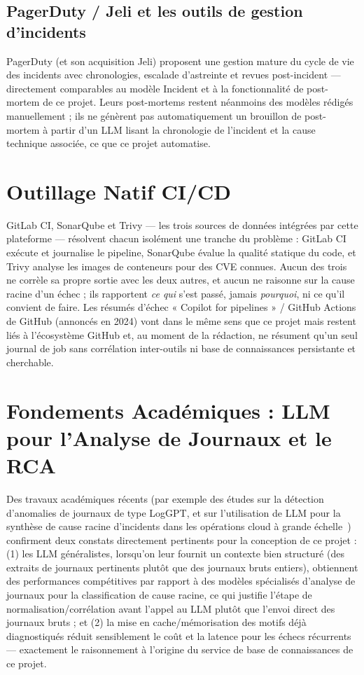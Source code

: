 \documentclass[12pt,a4paper,oneside]{report}
\begin{document}
\subsection{PagerDuty / Jeli et les outils de gestion d'incidents}
PagerDuty (et son acquisition Jeli) proposent une gestion mature du cycle de vie des incidents avec chronologies, escalade d'astreinte et revues post-incident --- directement comparables au modèle Incident et à la fonctionnalité de post-mortem de ce projet. Leurs post-mortems restent néanmoins des modèles rédigés manuellement ; ils ne génèrent pas automatiquement un brouillon de post-mortem à partir d'un LLM lisant la chronologie de l'incident et la cause technique associée, ce que ce projet automatise.

\section{Outillage Natif CI/CD}
GitLab CI, SonarQube et Trivy --- les trois sources de données intégrées par cette plateforme --- résolvent chacun isolément une tranche du problème : GitLab CI exécute et journalise le pipeline, SonarQube évalue la qualité statique du code, et Trivy analyse les images de conteneurs pour des CVE connues. Aucun des trois ne corrèle sa propre sortie avec les deux autres, et aucun ne raisonne sur la cause racine d'un échec ; ils rapportent \emph{ce qui} s'est passé, jamais \emph{pourquoi}, ni ce qu'il convient de faire. Les résumés d'échec « Copilot for pipelines » / GitHub Actions de GitHub (annoncés en 2024) vont dans le même sens que ce projet mais restent liés à l'écosystème GitHub et, au moment de la rédaction, ne résument qu'un seul journal de job sans corrélation inter-outils ni base de connaissances persistante et cherchable.

\section{Fondements Académiques : LLM pour l'Analyse de Journaux et le RCA}
Des travaux académiques récents (par exemple des études sur la détection d'anomalies de journaux de type LogGPT, et sur l'utilisation de LLM pour la synthèse de cause racine d'incidents dans les opérations cloud à grande échelle~\cite{gartner}) confirment deux constats directement pertinents pour la conception de ce projet : (1) les LLM généralistes, lorsqu'on leur fournit un contexte bien structuré (des extraits de journaux pertinents plutôt que des journaux bruts entiers), obtiennent des performances compétitives par rapport à des modèles spécialisés d'analyse de journaux pour la classification de cause racine, ce qui justifie l'étape de normalisation/corrélation avant l'appel au LLM plutôt que l'envoi direct des journaux bruts ; et (2) la mise en cache/mémorisation des motifs déjà diagnostiqués réduit sensiblement le coût et la latence pour les échecs récurrents --- exactement le raisonnement à l'origine du service de base de connaissances de ce projet.
\end{document}
